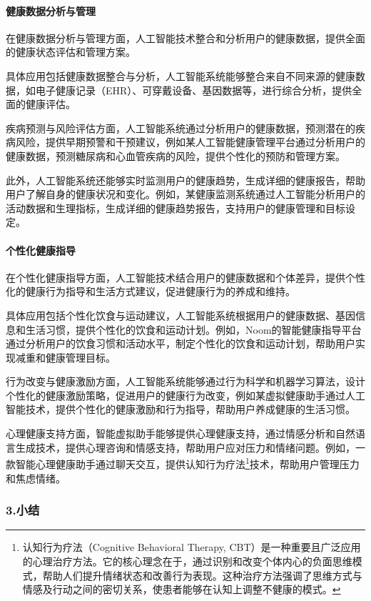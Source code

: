 \paragraph{健康数据分析与管理}

在健康数据分析与管理方面，人工智能技术整合和分析用户的健康数据，提供全面的健康状态评估和管理方案。

具体应用包括健康数据整合与分析，人工智能系统能够整合来自不同来源的健康数据，如电子健康记录（EHR）、可穿戴设备、基因数据等，进行综合分析，提供全面的健康评估。

疾病预测与风险评估方面，人工智能系统通过分析用户的健康数据，预测潜在的疾病风险，提供早期预警和干预建议，例如某人工智能健康管理平台通过分析用户的健康数据，预测糖尿病和心血管疾病的风险，提供个性化的预防和管理方案。

此外，人工智能系统还能够实时监测用户的健康趋势，生成详细的健康报告，帮助用户了解自身的健康状况和变化。例如，某健康监测系统通过人工智能分析用户的活动数据和生理指标，生成详细的健康趋势报告，支持用户的健康管理和目标设定。

\paragraph{个性化健康指导}

在个性化健康指导方面，人工智能技术结合用户的健康数据和个体差异，提供个性化的健康行为指导和生活方式建议，促进健康行为的养成和维持。

具体应用包括个性化饮食与运动建议，人工智能系统根据用户的健康数据、基因信息和生活习惯，提供个性化的饮食和运动计划。例如，Noom的智能健康指导平台通过分析用户的饮食习惯和活动水平，制定个性化的饮食和运动计划，帮助用户实现减重和健康管理目标。

行为改变与健康激励方面，人工智能系统能够通过行为科学和机器学习算法，设计个性化的健康激励策略，促进用户的健康行为改变，例如某虚拟健康助手通过人工智能技术，提供个性化的健康激励和行为指导，帮助用户养成健康的生活习惯。

心理健康支持方面，智能虚拟助手能够提供心理健康支持，通过情感分析和自然语言生成技术，提供心理咨询和情感支持，帮助用户应对压力和情绪问题。例如，一款智能心理健康助手通过聊天交互，提供认知行为疗法\footnote{认知行为疗法（Cognitive Behavioral Therapy, CBT）是一种重要且广泛应用的心理治疗方法。它的核心理念在于，通过识别和改变个体内心的负面思维模式，帮助人们提升情绪状态和改善行为表现。这种治疗方法强调了思维方式与情感及行动之间的密切关系，使患者能够在认知上调整不健康的模式。}技术，帮助用户管理压力和焦虑情绪。

\subsubsection{3.小结}

